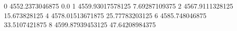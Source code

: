 0 4552.2373046875 0.0
1 4559.93017578125 7.69287109375
2 4567.9111328125 15.673828125
4 4578.01513671875 25.77783203125
6 4585.748046875 33.5107421875
8 4599.87939453125 47.64208984375
